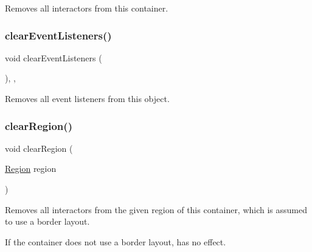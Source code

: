 Removes all interactors from this container. 

\mbox{\label{classsgl_1_1GObservable_a80cfa040459ff53594adbd6a51ec8f43}} 
\subsubsection{\texorpdfstring{clear\+Event\+Listeners()}{clearEventListeners()}}
{\footnotesize\ttfamily void clear\+Event\+Listeners (\begin{DoxyParamCaption}{ }\end{DoxyParamCaption})\hspace{0.3cm}{\ttfamily [protected]}, {\ttfamily [virtual]}, {\ttfamily [inherited]}}



Removes all event listeners from this object. 

\mbox{\label{classsgl_1_1GContainer_a47f0cc45498a78757fa4d0e6befc2981}} 
\subsubsection{\texorpdfstring{clear\+Region()}{clearRegion()}\hspace{0.1cm}{\footnotesize\ttfamily [1/2]}}
{\footnotesize\ttfamily void clear\+Region (\begin{DoxyParamCaption}\item[{\mbox{\hyperlink{classsgl_1_1GContainer_a81a01a86de31071a92e6cce0bab9bc4b}{Region}}}]{region }\end{DoxyParamCaption})\hspace{0.3cm}{\ttfamily [virtual]}}



Removes all interactors from the given region of this container, which is assumed to use a border layout. 

If the container does not use a border layout, has no effect. \mbox{\label{classsgl_1_1GContainer_aeba526cb4d6d6f3d8d6f376656af8dc8}} 
